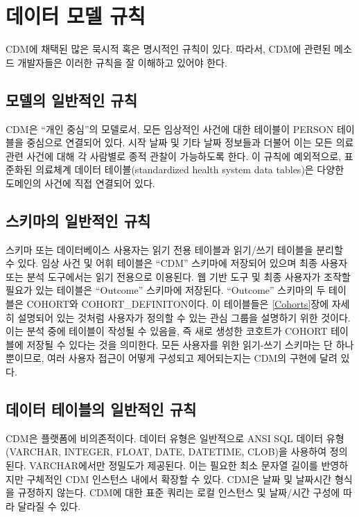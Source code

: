 \documentclass[11pt]{book}
\theoremstyle{definition}
\theoremstyle{definition}
\theoremstyle{definition}
\theoremstyle{remark}
\begin{document}
\section{데이터 모델 규칙}\label{--}

CDM에 채택된 많은 묵시적 혹은 명시적인 규칙이 있다. 따라서, CDM에 관련된
메소드 개발자들은 이러한 규칙을 잘 이해하고 있어야 한다.

\subsection{모델의 일반적인 규칙}\label{model-Conv}

CDM은 ``개인 중심''의 모델로서, 모든 임상적인 사건에 대한 테이블이
PERSON 테이블을 중심으로 연결되어 있다. 시작 날짜 및 기타 날짜 정보들과
더불어 이는 모든 의료 관련 사건에 대해 각 사람별로 종적 관찰이
가능하도록 한다. 이 규칙에 예외적으로, 표준화된 의료체계 데이터
테이블(standardized health system data tables)은 다양한 도메인의 사건에
직접 연결되어 있다.

\subsection{스키마의 일반적인 규칙}\label{--}

스키마 또는 데이터베이스 사용자는 읽기 전용 테이블과 읽기/쓰기 테이블을
분리할 수 있다. 임상 사건 및 어휘 테이블은 ``CDM'' 스키마에 저장되어
있으며 최종 사용자 또는 분석 도구에서는 읽기 전용으로 이용된다. 웹 기반
도구 및 최종 사용자가 조작할 필요가 있는 테이블은 ``Outcome'' 스키마에
저장된다. ``Outcome'' 스키마의 두 테이블은 COHORT와
COHORT\_DEFINITON이다. 이 테이블들은 \ref{Cohorts}장에 자세히 설명되어
있는 것처럼 사용자가 정의할 수 있는 관심 그룹을 설명하기 위한 것이다.
이는 분석 중에 테이블이 작성될 수 있음을, 즉 새로 생성한 코호트가 COHORT
테이블에 저장될 수 있다는 것을 의미한다. 모든 사용자를 위한 읽기-쓰기
스키마는 단 하나뿐이므로, 여러 사용자 접근이 어떻게 구성되고
제어되는지는 CDM의 구현에 달려 있다.

\subsection{데이터 테이블의 일반적인 규칙}\label{---}

CDM은 플랫폼에 비의존적이다. 데이터 유형은 일반적으로 ANSI SQL 데이터
유형(VARCHAR, INTEGER, FLOAT, DATE, DATETIME, CLOB)을 사용하여 정의된다.
VARCHAR에서만 정밀도가 제공된다. 이는 필요한 최소 문자열 길이를
반영하지만 구체적인 CDM 인스턴스 내에서 확장할 수 있다. CDM은 날짜 및
날짜시간 형식을 규정하지 않는다. CDM에 대한 표준 쿼리는 로컬 인스턴스 및
날짜/시간 구성에 따라 달라질 수 있다.
\end{document}
